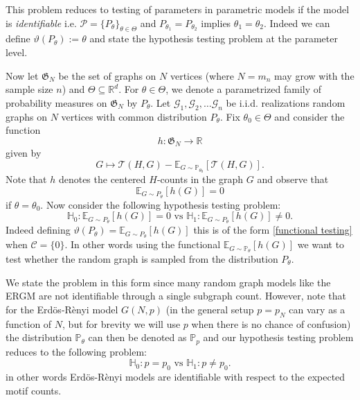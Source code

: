 \documentclass[12pt]{article}
\def\P{\mathbb{P}}
\def\E{\mathbb{E}}
\def\H{\mathbb{H}}
\def\er{ Erd{\"o}s-R{\`e}nyi }
\numberwithin{equation}{section}
\begin{document}
This problem reduces to testing of parameters in parametric models if the model is \textit{identifiable} i.e.  $\mathcal P =\{P_{\theta}\}_{\theta \in \Theta}$ and $P_{\theta_1}=P_{\theta_2}$ implies $\theta_1=\theta_2$. Indeed we can define $\vartheta(P_{\theta}):=\theta$ and state the hypothesis testing problem at the parameter level.

Now let $\mathfrak{G}_N$ be the set of graphs on $N$ vertices  (where $N=m_n$ may grow with the sample size $n$) and $\Theta\subseteq \mathbb{R}^d$. For $\theta\in \Theta$, we denote a parametrized family of probability measures on $\mathfrak{G}_N$ by $P_{\theta}$.
Let $\mathcal{G}_1,\mathcal{G}_2,\ldots \mathcal{G}_n$ be i.i.d. realizations random graphs on $N$ vertices with common distribution $P_{\theta}$. 
Fix $\theta_0\in \Theta$ and consider the function
\[
h:\mathfrak{G}_N\rightarrow \mathbb{R}
\]
given by
\[
G\mapsto \mathcal{T}(H,G)-\E_{G\sim \P_{\theta_0}}[\mathcal{T}(H,G)].
\]
Note that $h$ denotes the centered \(H\)-counts in the graph $G$ and observe that \begin{equation}\mathbb{E}_{G\sim P_{\theta}}[h(G)]=0\label{unbiased_count}\end{equation} if $\theta=\theta_0$. Now consider the following hypothesis testing problem:
\begin{equation}
\H_0: \mathbb{E}_{G\sim P_{\theta}}[h(G)]=0 \text{ vs } \H_1: \mathbb{E}_{G\sim P_{\theta}}[h(G)]\neq 0. \label{general_gof_statement}
\end{equation}
Indeed  defining $\vartheta(P_{\theta})=\mathbb{E}_{G\sim P_{\theta}}[h(G)]$ this is of the form \eqref{functional testing} when $\mathcal C=\{0\}$. In other words using the functional $\mathbb{E}_{G\sim \mathbb{P}_{\theta}}[h(G)]$ we want to test whether the random graph is sampled from the distribution $P_{\theta}$.

We state the problem in this form since many random graph models like the ERGM are not identifiable through a single subgraph count.
However, note that for the \er model $G(N,p)$ (in the general setup $p=p_N$ can vary as a function of $N$, but for brevity we will use $p$ when there is no chance of confusion) the distribution $\P_{\theta}$ can then be denoted as $\P_{p}$ and our hypothesis testing problem reduces to the following problem:
\begin{equation}
\H_0: p=p_0 \text{ vs } \H_1: p\neq p_0. 
\end{equation}
in other words \er models are identifiable with respect to the expected motif counts.
\end{document}
